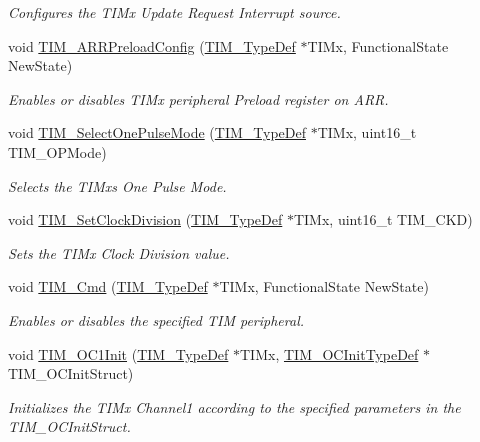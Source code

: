 \begin{DoxyCompactItemize}
\begin{DoxyCompactList}\small\item\em Configures the T\+I\+Mx Update Request Interrupt source. \end{DoxyCompactList}\item 
void \hyperlink{group___t_i_m_ga42b44b9fc2b0798d733720dd6bac1ac0}{T\+I\+M\+\_\+\+A\+R\+R\+Preload\+Config} (\hyperlink{struct_t_i_m___type_def}{T\+I\+M\+\_\+\+Type\+Def} $\ast$T\+I\+Mx, Functional\+State New\+State)
\begin{DoxyCompactList}\small\item\em Enables or disables T\+I\+Mx peripheral Preload register on A\+RR. \end{DoxyCompactList}\item 
void \hyperlink{group___t_i_m_gadd2cca5fac6c1291dc4339098d5c9562}{T\+I\+M\+\_\+\+Select\+One\+Pulse\+Mode} (\hyperlink{struct_t_i_m___type_def}{T\+I\+M\+\_\+\+Type\+Def} $\ast$T\+I\+Mx, uint16\+\_\+t T\+I\+M\+\_\+\+O\+P\+Mode)
\begin{DoxyCompactList}\small\item\em Selects the T\+I\+Mx\textquotesingle{}s One Pulse Mode. \end{DoxyCompactList}\item 
void \hyperlink{group___t_i_m_ga20ef804dc32c723662d11ee7da3baab2}{T\+I\+M\+\_\+\+Set\+Clock\+Division} (\hyperlink{struct_t_i_m___type_def}{T\+I\+M\+\_\+\+Type\+Def} $\ast$T\+I\+Mx, uint16\+\_\+t T\+I\+M\+\_\+\+C\+KD)
\begin{DoxyCompactList}\small\item\em Sets the T\+I\+Mx Clock Division value. \end{DoxyCompactList}\item 
void \hyperlink{group___t_i_m_ga2bdc275bcbd2ce9d1ba632e6c89896b7}{T\+I\+M\+\_\+\+Cmd} (\hyperlink{struct_t_i_m___type_def}{T\+I\+M\+\_\+\+Type\+Def} $\ast$T\+I\+Mx, Functional\+State New\+State)
\begin{DoxyCompactList}\small\item\em Enables or disables the specified T\+IM peripheral. \end{DoxyCompactList}\item 
void \hyperlink{group___t_i_m_gafcdb6ff00158862aef7fed5e7a554a3e}{T\+I\+M\+\_\+\+O\+C1\+Init} (\hyperlink{struct_t_i_m___type_def}{T\+I\+M\+\_\+\+Type\+Def} $\ast$T\+I\+Mx, \hyperlink{struct_t_i_m___o_c_init_type_def}{T\+I\+M\+\_\+\+O\+C\+Init\+Type\+Def} $\ast$T\+I\+M\+\_\+\+O\+C\+Init\+Struct)
\begin{DoxyCompactList}\small\item\em Initializes the T\+I\+Mx Channel1 according to the specified parameters in the T\+I\+M\+\_\+\+O\+C\+Init\+Struct. \end{DoxyCompactList}\item 

\end{DoxyCompactItemize}
